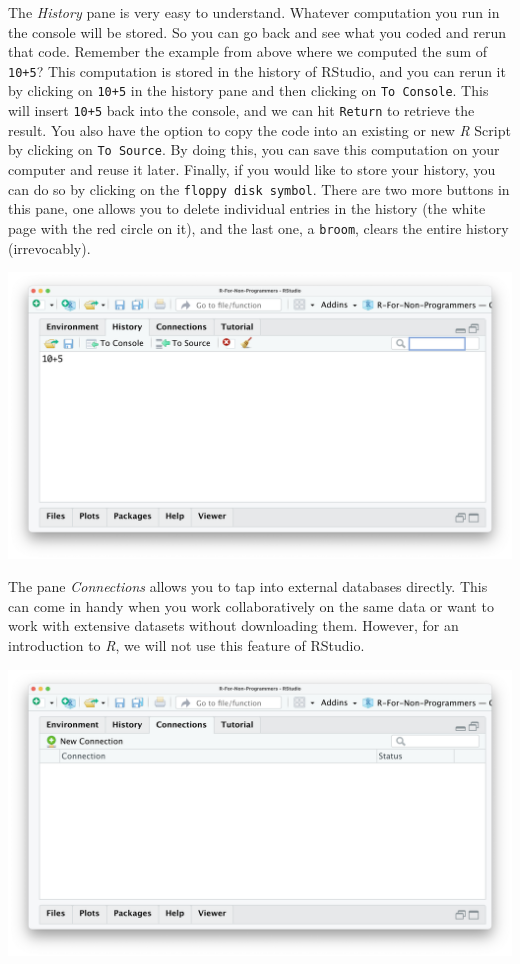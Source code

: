 \documentclass[
  letterpaper,
]{krantz}
\begin{document}
The \emph{History} pane is very easy to understand. Whatever computation
you run in the console will be stored. So you can go back and see what
you coded and rerun that code. Remember the example from above where we
computed the sum of \texttt{10+5}? This computation is stored in the
history of RStudio, and you can rerun it by clicking on \texttt{10+5} in
the history pane and then clicking on \texttt{To\ Console}. This will
insert \texttt{10+5} back into the console, and we can hit
\texttt{Return} to retrieve the result. You also have the option to copy
the code into an existing or new \emph{R} Script by clicking on
\texttt{To\ Source}. By doing this, you can save this computation on
your computer and reuse it later. Finally, if you would like to store
your history, you can do so by clicking on the
\texttt{floppy\ disk\ symbol}. There are two more buttons in this pane,
one allows you to delete individual entries in the history (the white
page with the red circle on it), and the last one, a \texttt{broom},
clears the entire history (irrevocably).

\includegraphics{images/chapter_04_img/04_environment_history_etc/02_rstudio_history.png}

The pane \emph{Connections} allows you to tap into external databases
directly. This can come in handy when you work collaboratively on the
same data or want to work with extensive datasets without downloading
them. However, for an introduction to \emph{R}, we will not use this
feature of RStudio.

\includegraphics{images/chapter_04_img/04_environment_history_etc/03_rstudio_connections.png}
\end{document}
